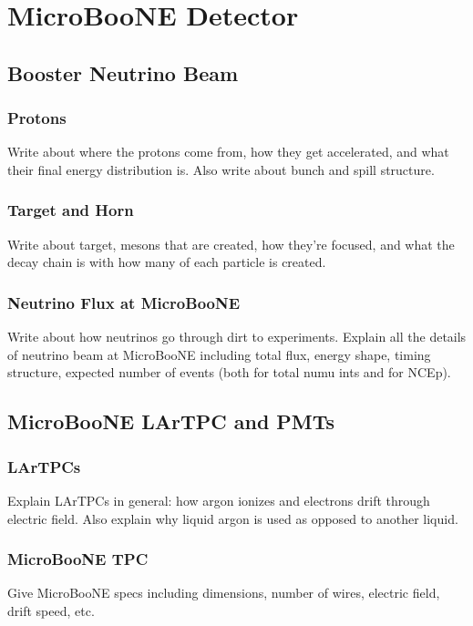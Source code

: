\section{MicroBooNE Detector}\label{microboone}

\subsection{Booster Neutrino Beam}\label{beam}
  \subsubsection{Protons}
    Write about where the protons come from, how they get accelerated, and what
    their final energy distribution is. Also write about bunch and spill
    structure.
  \subsubsection{Target and Horn}
    Write about target, mesons that are created, how they're focused, and what
    the decay chain is with how many of each particle is created. 
  \subsubsection{Neutrino Flux at MicroBooNE}
    Write about how neutrinos go through dirt to experiments. Explain all the
    details of neutrino beam at MicroBooNE including total flux, energy shape,
    timing structure, expected number of events (both for total numu ints and
        for NCEp).
 
\subsection{MicroBooNE LArTPC and PMTs}\label{tpc}
  \subsubsection{LArTPCs}
    Explain LArTPCs in general: how argon ionizes and electrons drift through
    electric field. Also explain why liquid argon is used as opposed to another
    liquid.
  \subsubsection{MicroBooNE TPC}
    Give MicroBooNE specs including dimensions, number of wires, electric
    field, drift speed, etc.
